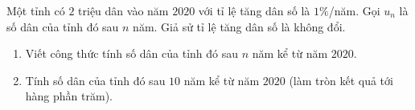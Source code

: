 \begin{ex}%
	Một tỉnh có $2$ triệu dân vào năm $2020$ với tỉ lệ tăng dân số là $1\%$/năm. Gọi $u_n$ là số dân của tỉnh đó sau $n$ năm.  Giả sử tỉ lệ tăng dân số là không đổi.
	\begin{enumerate}
		\item Viết công thức tính số  dân của tỉnh đó sau $n$ năm kể từ năm $2020$.
		\item Tính số dân của tỉnh đó sau $10$ năm kể từ năm $2020$ (làm tròn  kết quả tới hàng phần trăm).
	\end{enumerate}
\end{ex}

